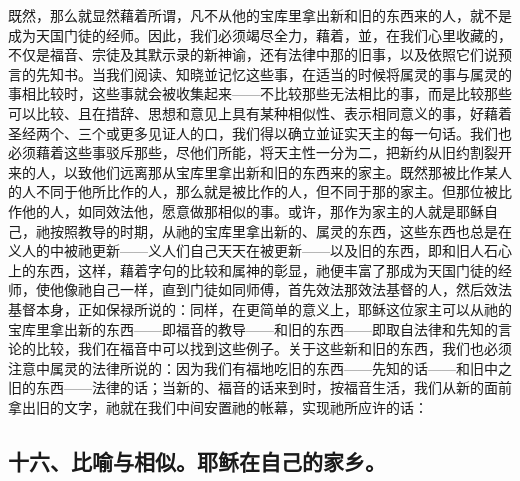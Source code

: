 既然，那么就显然藉着所谓，凡不从他的宝库里拿出新和旧的东西来的人，就不是成为天国门徒的经师。因此，我们必须竭尽全力，藉着，並，在我们心里收藏的，不仅是福音、宗徒及其默示录的新神谕，还有法律中那的旧事，以及依照它们说预言的先知书。当我们阅读、知晓並记忆这些事，在适当的时候将属灵的事与属灵的事相比较时，这些事就会被收集起来——不比较那些无法相比的事，而是比较那些可以比较、且在措辞、思想和意见上具有某种相似性、表示相同意义的事，好藉着圣经两个、三个或更多见证人的口，我们得以确立並证实天主的每一句话。我们也必须藉着这些事驳斥那些，尽他们所能，将天主性一分为二，把新约从旧约割裂开来的人，以致他们远离那从宝库里拿出新和旧的东西来的家主。既然那被比作某人的人不同于他所比作的人，那么就是被比作的人，但不同于那的家主。但那位被比作他的人，如同效法他，愿意做那相似的事。或许，那作为家主的人就是耶稣自己，祂按照教导的时期，从祂的宝库里拿出新的、属灵的东西，这些东西也总是在义人的中被祂更新——义人们自己天天在被更新——以及旧的东西，即和旧人石心上的东西，这样，藉着字句的比较和属神的彰显，祂便丰富了那成为天国门徒的经师，使他像祂自己一样，直到门徒如同师傅，首先效法那效法基督的人，然后效法基督本身，正如保禄所说的：同样，在更简单的意义上，耶稣这位家主可以从祂的宝库里拿出新的东西——即福音的教导——和旧的东西——即取自法律和先知的言论的比较，我们在福音中可以找到这些例子。关于这些新和旧的东西，我们也必须注意中属灵的法律所说的：因为我们有福地吃旧的东西——先知的话——和旧中之旧的东西——法律的话；当新的、福音的话来到时，按福音生活，我们从新的面前拿出旧的文字，祂就在我们中间安置祂的帐幕，实现祂所应许的话：\par


\subsection{十六、比喻与相似。耶稣在自己的家乡。}

